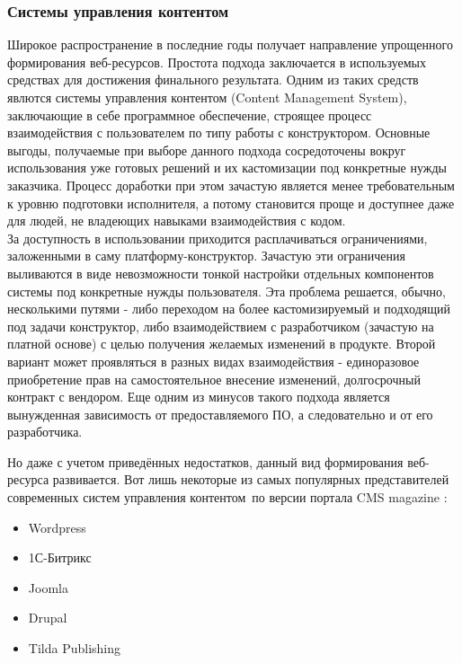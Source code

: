     \subsubsection{Системы управления контентом}
        Широкое распространение в последние годы получает направление упрощенного формирования веб-ресурсов.
        Простота подхода заключается в используемых средствах для достижения финального результата.
        Одним из таких средств явлются системы управления контентом (Content Management System), заключающие в себе программное обеспечение, строящее процесс взаимодействия с пользователем по типу работы с конструктором. %
        Основные выгоды, получаемые при выборе данного подхода сосредоточены вокруг использования уже готовых решений и их кастомизации под конкретные нужды заказчика.
        Процесс доработки при этом зачастую является менее требовательным к уровню подготовки исполнителя, а потому становится проще и доступнее даже для людей, не владеющих навыками взаимодействия с кодом.\\
        За доступность в использовании приходится расплачиваться ограничениями, заложенными в саму платформу-конструктор.
        Зачастую эти ограничения выливаются в виде невозможности тонкой настройки отдельных компонентов системы под конкретные нужды пользователя.
        Эта проблема решается, обычно, несколькими путями - либо переходом на более кастомизируемый и подходящий под задачи конструктор, либо взаимодействием с разработчиком (зачастую на платной основе) с целью получения желаемых изменений в продукте.
        Второй вариант может проявляться в разных видах взаимодействия - единоразовое приобретение прав на самостоятельное внесение изменений, долгосрочный контракт с вендором.
        Еще одним из минусов такого подхода является вынужденная зависимость от предоставляемого ПО, а следовательно и от его разработчика.

        Но даже с учетом приведённых недостатков, данный вид формирования веб-ресурса развивается.
        Вот лишь некоторые из самых популярных представителей современных систем управления контентом по версии портала CMS magazine \cite{}:
        \begin{itemize}
            \item Wordpress
            \item 1С-Битрикс
            \item Joomla
            \item Drupal
            \item Tilda Publishing
        \end{itemize}

